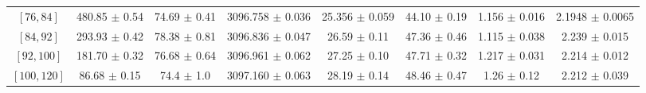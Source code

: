 \begin{tabular}{c||c|c|c|c|c|c|c}
$[76, 84]$ & 480.85 $\pm$ 0.54 & 74.69 $\pm$ 0.41 & 3096.758 $\pm$ 0.036 & 25.356 $\pm$ 0.059 & 44.10 $\pm$ 0.19 & 1.156 $\pm$ 0.016 & 2.1948 $\pm$ 0.0065\\
$[84, 92]$ & 293.93 $\pm$ 0.42 & 78.38 $\pm$ 0.81 & 3096.836 $\pm$ 0.047 & 26.59 $\pm$ 0.11 & 47.36 $\pm$ 0.46 & 1.115 $\pm$ 0.038 & 2.239 $\pm$ 0.015\\
$[92, 100]$ & 181.70 $\pm$ 0.32 & 76.68 $\pm$ 0.64 & 3096.961 $\pm$ 0.062 & 27.25 $\pm$ 0.10 & 47.71 $\pm$ 0.32 & 1.217 $\pm$ 0.031 & 2.214 $\pm$ 0.012\\
$[100, 120]$ & 86.68 $\pm$ 0.15 & 74.4 $\pm$ 1.0 & 3097.160 $\pm$ 0.063 & 28.19 $\pm$ 0.14 & 48.46 $\pm$ 0.47 & 1.26 $\pm$ 0.12 & 2.212 $\pm$ 0.039\\
\end{tabular}
